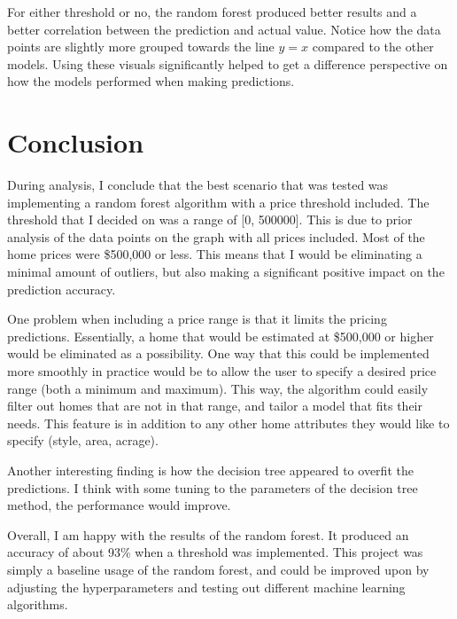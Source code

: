 \documentclass[12pt]{article}
\begin{document}
        For either threshold or no, the random forest produced better results and a better correlation between the prediction and actual 
        value. Notice how the data points are slightly more grouped towards the line $y = x$ compared to the other models. Using these visuals 
        significantly helped to get a difference perspective on how the models performed when making predictions.

\section{Conclusion}
During analysis, I conclude that the best scenario that was tested was implementing a random forest algorithm with a price threshold included. 
The threshold that I decided on was a range of [0, 500000]. This is due to prior analysis of the data points on the graph with all prices included.
Most of the home prices were \$500,000 or less. This means that I would be eliminating a minimal amount of outliers, but also making a significant 
positive impact on the prediction accuracy. 

One problem when including a price range is that it limits the pricing predictions. Essentially, a home that would be estimated at \$500,000 or higher would 
be eliminated as a possibility. One way that this could be implemented more smoothly in practice 
would be to allow the user to specify a desired price range (both a minimum and maximum). This way, the algorithm could easily filter out homes that are not in that 
range, and tailor a model that fits their needs. This feature is in addition to any other home attributes they would like to specify (style, area, acrage).

Another interesting finding is how the decision tree appeared to overfit the predictions. I think with some tuning to the parameters of the decision 
tree method, the performance would improve. 

Overall, I am happy with the results of the random forest. It produced an accuracy of about 93\% when a threshold was implemented. This project was simply a baseline 
usage of the random forest, and could be improved upon by adjusting the hyperparameters and testing out different machine learning algorithms. 
\end{document}
